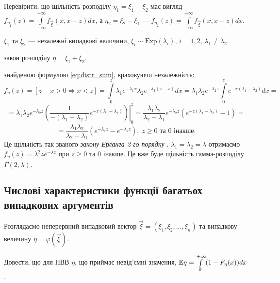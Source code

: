 \begin{exercise}
    Перевірити, що щільність розподілу $\eta_1 = \xi_1 - \xi_2$ має вигляд
    $f_{\eta_1}(z) = \int\limits_{-\infty}^{+\infty} f_{\vec{\xi}}(x, x-z) dx$, а 
    $\eta_2 = \xi_2 - \xi_1$ --- $f_{\eta_2}(z) = \int\limits_{-\infty}^{+\infty} f_{\vec{\xi}}(x, x+z) dx$.
\end{exercise}

\begin{example}
    $\xi_1$ та $\xi_2$ --- незалежні випадкові величини, $\xi_i \sim \mathrm{Exp}(\lambda_i)$, 
    $i = 1,2$, $\lambda_1 \neq \lambda_2$.

     закон розподілу $\eta = \xi_1 + \xi_2$.

     знайденою формулою \eqref{eq:distr_sum}, враховуючи незалежність:
    \begin{equation*}
        f_\eta(z) = \left[z - x > 0 \Rightarrow x < z\right] = 
        \int\limits_0^z \lambda_1 e^{-\lambda_1 x}\lambda_2e^{-\lambda_2(z-x)}dx
        =
        \lambda_1\lambda_2e^{-\lambda_2z}\int\limits_0^z e^{-x(\lambda_1 - \lambda_2)} dx=
    \end{equation*}
    \begin{equation*}
        =\lambda_1\lambda_2e^{-\lambda_2z}
        \left.
        \left(\frac{1}{-(\lambda_1 - \lambda_2)} e^{-x(\lambda_1 - \lambda_2)}\right)
        \right|_0^z = 
        \frac{\lambda_1\lambda_2}{\lambda_2 - \lambda_1}e^{-\lambda_2z}
        (e^{-z(\lambda_1 - \lambda_2)} - 1) =
    \end{equation*}
    \begin{equation*}
        = \frac{\lambda_1\lambda_2}{\lambda_2 - \lambda_1}(e^{-\lambda_1 z} - e^{-\lambda_2 z})
        ,\; z \geq 0 \text{ та } 0 \text{ інакше.}
    \end{equation*}
Це щільність так званого \emph{закону Ерланга 2-го порядку} .
 $\lambda_1 = \lambda_2 = \lambda$ отримаємо
$f_{\eta}(z) = \lambda^2 z e^{-\lambda z}$ при $z \geq 0$ та $0$ інакше.
Це вже буде щільність гамма-розподілу $\Gamma(2, \lambda)$.
\end{example}

\subsection{Числові характеристики функції багатьох випадкових аргументів}
Розглядаємо неперервний випадковий вектор $\vec{\xi} = (\xi_1, \xi_2, ..., \xi_n)$ та
випадкову величину $\eta = \varphi(\vec{\xi})$.
\begin{exercise}
    Довести, що для НВВ $\eta$, що приймає невід'ємні значення, $\mathbb{E}\eta = \int\limits_0^{+\infty} (1 - F_{\eta}(x)) dx$.
\end{exercise}

